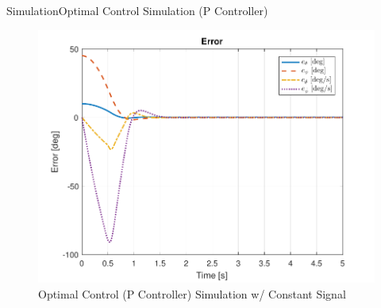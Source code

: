 \documentclass{beamer}
\begin{document}
\begin{frame}{Simulation}{Optimal Control Simulation (P Controller)}
    \begin{figure}
      \centering 
      \includegraphics[scale=0.5]{figs/MATLAB/LQR/P_Simulation/LQR_Error_Con}
      \caption{Optimal Control (P Controller) Simulation w/ Constant Signal}
      \label{fig:LQR_Error_Con}
    \end{figure}
\end{frame}

\end{document}
